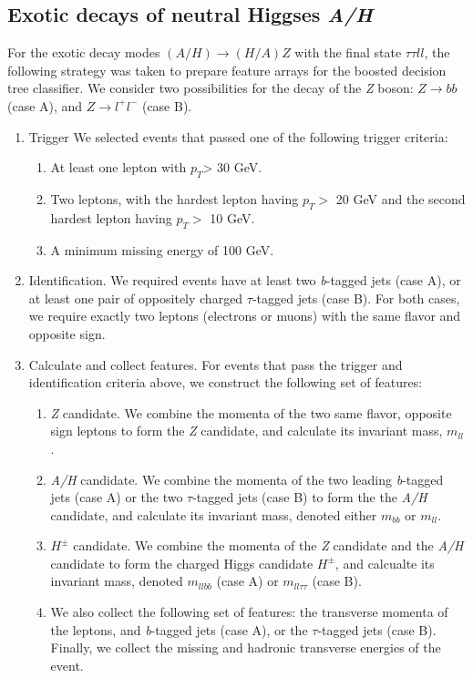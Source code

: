 {\subsection{Exotic decays of neutral Higgses \emph{A/H}}\label{subsec:A_HZ_analysis}
For the exotic decay modes $(A/H)\rightarrow(H/A)Z$ with the final state $\tau\tau ll$, the following strategy was taken to prepare feature arrays for the boosted decision tree classifier. We consider two possibilities for the decay of the \emph{Z} boson: $Z\rightarrow bb$ (case A), and $Z\rightarrow l^+l^-$ (case B).
\begin{enumerate}
  \item{Trigger} We selected events that passed one of the following trigger criteria:
    \begin{enumerate}
      \item At least one lepton with $p_T$> 30 GeV.
      \item Two leptons, with the hardest lepton having $p_T > $ 20 GeV and the second hardest lepton having $p_T > $ 10 GeV.
      \item A minimum missing energy of 100 GeV.
    \end{enumerate}
  \item {Identification}. We required events have at least two \emph{b}-tagged jets (case A), or at least one pair of oppositely charged $\tau$-tagged jets (case B). For both cases, we require exactly two leptons (electrons or muons) with the same flavor and opposite sign.
  \item{Calculate and collect features}. For events that pass the trigger and identification criteria above, we construct the following set of features:
    \begin{enumerate}
      \item {\emph{Z} candidate}. We combine the momenta of the two same flavor, opposite sign leptons to form the \emph{Z} candidate, and calculate its invariant mass,  $m_{ll}$.
      \item {\emph{A/H} candidate}. We combine the momenta of the two leading \emph{b}-tagged jets (case A) or the two $\tau$-tagged jets (case B) to form the the \emph{A/H} candidate, and calculate its invariant mass, denoted either $m_{bb}$ or $m_{ll}$.
      \item {$H^\pm$ candidate}. We combine the momenta of the \emph{Z} candidate and the \emph{A/H} candidate to form the charged Higgs candidate $H^\pm$, and calcualte its invariant mass, denoted $m_{llbb}$ (case A) or $m_{ll\tau\tau}$ (case B).
      \item We also collect the following set of features: the transverse momenta of the leptons, and \emph{b}-tagged jets (case A), or the $\tau$-tagged jets (case B). Finally, we collect the missing and hadronic transverse energies of the event.
    \end{enumerate}
\end{enumerate}
}

